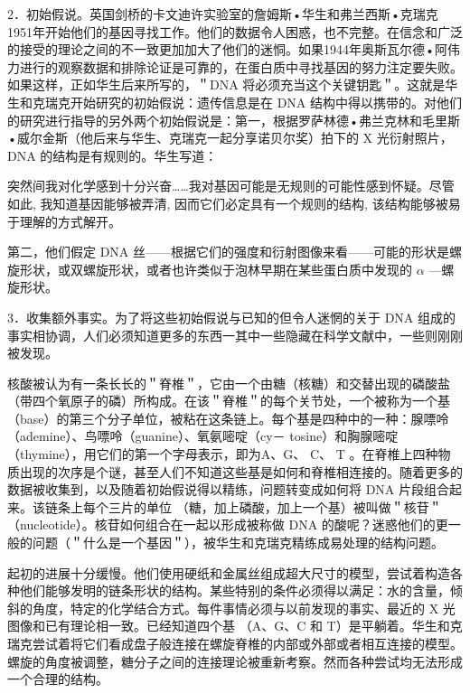 2．初始假说。英国剑桥的卡文迪许实验室的詹姆斯•华生和弗兰西斯•克瑞克1951年开始他们的基因寻找工作。他们的数据令人困惑，也不完整。在信念和广泛的接受的理论之间的不一致更加加大了他们的迷恫。如果1944年奥斯瓦尔德•阿伟力进行的观察数据和排除论证是可靠的，在蛋白质中寻找基因的努力注定要失败。如果这样，正如华生后来所写的，＂DNA 将必须充当这个关键钥匙＂\cite{watson1968b}。这就是华生和克瑞克开始研究的初始假说：遗传信息是在 DNA 结构中得以携带的。对他们的研究进行指导的另外两个初始假说是：第一，根据罗萨林德•弗兰克林和毛里斯•威尔金斯（他后来与华生、克瑞克一起分享诺贝尔奖）拍下的 X 光衍射照片，DNA 的结构是有规则的。华生写道：

\begin{displayquote}
突然间我对化学感到十分兴奋……我对基因可能是无规则的可能性感到怀疑。尽管如此, 我知道基因能够被弄清, 因而它们必定具有一个规则的结构, 该结构能够被易于理解的方式解开。\cite{watson1968c}
\end{displayquote}

第二，他们假定 DNA 丝——根据它们的强度和衍射图像来看——可能的形状是螺旋形状，或双螺旋形状，或者也许类似于泡林早期在某些蛋白质中发现的 $\alpha$ —螺旋形状。

3．收集额外事实。为了将这些初始假说与已知的但令人迷惘的关于 DNA 组成的事实相协调，人们必须知道更多的东西一其中一些隐藏在科学文献中，一些则刚刚被发现。

核酸被认为有一条长长的＂脊椎＂，它由一个由糖（核糖）和交替出现的磷酸盐（带四个氧原子的磷）所构成。在该＂脊椎＂的每个关节处，一个被称为一个基（base）的第三个分子单位，被粘在这条链上。每个基是四种中的一种：腺嘌呤（ademine）、鸟嘌呤（guanine）、氧氨嘧啶（cy－ tosine）和胸腺嘧啶（thymine），用它们的第一个字母表示，即为A、G、 C、 T 。在脊椎上四种物质出现的次序是个谜，甚至人们不知道这些基是如何和脊椎相连接的。随着更多的数据被收集到，以及随着初始假说得以精练，问题转变成如何将 DNA 片段组合起来。该链条上每个三片的单位 （糖，加上磷酸，加上一个基）被叫做＂核苷＂（nucleotide）。核苷如何组合在一起以形成被称做 DNA 的酸呢？迷惑他们的更一般的问题（＂什么是一个基因＂），被华生和克瑞克精练成易处理的结构问题。

起初的进展十分缓慢。他们使用硬纸和金属丝组成超大尺寸的模型，尝试着构造各种他们能够发明的链条形状的结构。某些特别的条件必须得以满足：水的含量，倾斜的角度，特定的化学结合方式。每件事情必须与以前发现的事实、最近的 X 光图像和已有理论相一致。已经知道四个基 （A、G、C 和 T）是平躺着。华生和克瑞克尝试着将它们看成盘子般连接在螺旋脊椎的内部或外部或者相互连接的模型。螺旋的角度被调整，糖分子之间的连接理论被重新考察。然而各种尝试均无法形成一个合理的结构。


